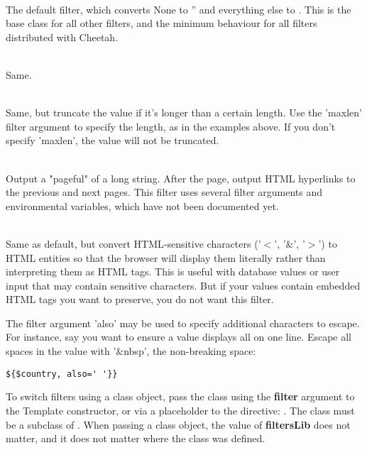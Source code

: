 \begin{description}
\item{}
     \\ The default filter, which converts None to '' and everything else to
     .  This is the base class for all other filters,
     and the minimum behaviour for all filters distributed with Cheetah.
\item{}
     \\ Same.
\item{}
     \\ Same, but truncate the value if it's longer than a certain length.
     Use the 'maxlen' filter argument to specify the length, as in the
     examples above.  If you don't specify 'maxlen', the value will not be
     truncated.
\item{}
     \\ Output a "pageful" of a long string.  After the page, output HTML
     hyperlinks to the previous and next pages.  This filter uses several
     filter arguments and environmental variables, which have not been 
     documented yet.
\item{}
     \\ Same as default, but convert HTML-sensitive characters ('$<$', '\&',
     '$>$')
     to HTML entities so that the browser will display them literally rather
     than interpreting them as HTML tags.  This is useful with database values
     or user input that may contain sensitive characters.  But if your values
     contain embedded HTML tags you want to preserve, you do not want this 
     filter.
     
     The filter argument 'also' may be used to specify additional characters to
     escape.  For instance, say you want to ensure a value displays all on one
     line.  Escape all spaces in the value with '\&nbsp', the non-breaking
     space:
\begin{verbatim}
${$country, also=' '}}
\end{verbatim}
\end{description}

To switch filters using a class object, pass the class using the
{\bf filter} argument to the Template constructor, or via a placeholder to the
 directive: .  The class must be
a subclass of .  When passing a class object, the
value of {\bf filtersLib} does not matter, and it does not matter where the
class was defined.

